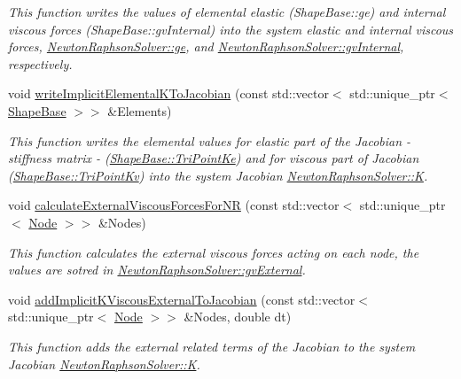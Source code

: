 \begin{DoxyCompactItemize}
\begin{DoxyCompactList}\small\item\em This function writes the values of elemental elastic (Shape\+Base\+::ge) and internal viscous forces (Shape\+Base\+::gv\+Internal) into the system elastic and internal viscous forces, \hyperlink{classNewtonRaphsonSolver_a3b2a215e49d3c1d6d12eb7c8c73e9ff6}{Newton\+Raphson\+Solver\+::ge}, and \hyperlink{classNewtonRaphsonSolver_a79fd12919ceb329bc177f16f3ce897b6}{Newton\+Raphson\+Solver\+::gv\+Internal}, respectively. \end{DoxyCompactList}\item 
void \hyperlink{classNewtonRaphsonSolver_a0d6e3a4d0cf1c6e4fdf2753c7f08df13}{write\+Implicit\+Elemental\+K\+To\+Jacobian} (const std\+::vector$<$ std\+::unique\+\_\+ptr$<$ \hyperlink{classShapeBase}{Shape\+Base} $>$$>$ \&Elements)
\begin{DoxyCompactList}\small\item\em This function writes the elemental values for elastic part of the Jacobian -\/ stiffness matrix -\/ (\hyperlink{classShapeBase_ace20710f27099833509c474b221c25df}{Shape\+Base\+::\+Tri\+Point\+Ke}) and for viscous part of Jacobian (\hyperlink{classShapeBase_a7fa5b1338e405a2c75c8d010f4153b05}{Shape\+Base\+::\+Tri\+Point\+Kv}) into the system Jacobian \hyperlink{classNewtonRaphsonSolver_a4e9ffc424dd37c6c00f9de3d7ac455ed}{Newton\+Raphson\+Solver\+::\+K}. \end{DoxyCompactList}\item 
void \hyperlink{classNewtonRaphsonSolver_ad39200f7babf1a3761a010c1a43f7c22}{calculate\+External\+Viscous\+Forces\+For\+N\+R} (const std\+::vector$<$ std\+::unique\+\_\+ptr$<$ \hyperlink{classNode}{Node} $>$$>$ \&Nodes)
\begin{DoxyCompactList}\small\item\em This function calculates the external viscous forces acting on each node, the values are sotred in \hyperlink{classNewtonRaphsonSolver_a80160d7bfb04a39e3b8910b68f66aa6d}{Newton\+Raphson\+Solver\+::gv\+External}. \end{DoxyCompactList}\item 
void \hyperlink{classNewtonRaphsonSolver_a78759a96ed41bf35e8401b7c63180ea2}{add\+Implicit\+K\+Viscous\+External\+To\+Jacobian} (const std\+::vector$<$ std\+::unique\+\_\+ptr$<$ \hyperlink{classNode}{Node} $>$$>$ \&Nodes, double dt)
\begin{DoxyCompactList}\small\item\em This function adds the external related terms of the Jacobian to the system Jacobian \hyperlink{classNewtonRaphsonSolver_a4e9ffc424dd37c6c00f9de3d7ac455ed}{Newton\+Raphson\+Solver\+::\+K}. \end{DoxyCompactList}\item 
$$
\end{DoxyCompactItemize}
